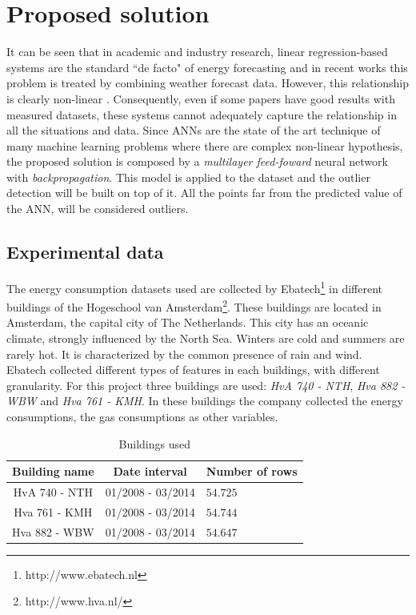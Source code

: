 \documentclass{sig-alternate-sigmod07}
\begin{document}
\section{Proposed solution}

It can be seen that in academic and industry research, linear regression-based systems are the standard ``de facto" of energy forecasting and in recent works this problem is treated by combining weather forecast data. However, this relationship is clearly non-linear \cite{hippert2001neural}. Consequently, even if some papers have good results with measured datasets, these systems cannot adequately capture the relationship in all the situations and data. Since ANNs are the state of the art technique of many machine learning problems where there are complex non-linear hypothesis, the proposed solution is composed by a \textit{multilayer feed-foward} neural network with \textit{backpropagation}. This model is applied to the dataset and the outlier detection will be built on top of it. All the points far from the predicted value of the ANN, will be considered outliers.

\subsection{Experimental data}
The energy consumption datasets used are collected by Ebatech\footnote{http://www.ebatech.nl} in different buildings of the Hogeschool van Amsterdam\footnote{http://www.hva.nl/}. These buildings are located in Amsterdam, the capital city of The Netherlands. This city has an oceanic climate, strongly influenced by the North Sea. Winters are cold and summers are rarely hot. It is characterized by the common presence of rain and wind.\\
Ebatech collected different types of features in each buildings, with different granularity. For this project three buildings are used: \textit{HvA 740 - NTH}, \textit{Hva 882 - WBW} and \textit{Hva 761 - KMH}. In these buildings the company collected the energy consumptions, the gas consumptions as other variables.

\begin{table}
\centering
\caption{Buildings used}
\label{tab:dataset}
\begin{tabular}{|c|c|l|} \hline
Building name&Date interval&Number of rows\\ \hline\hline
HvA 740 - NTH & 01/2008 - 03/2014 & $54.725$\\ \hline
Hva 761 - KMH & 01/2008 - 03/2014 & $54.744$\\ \hline
Hva 882 - WBW& 01/2008 - 03/2014 & $54.647$\\ \hline
\end{tabular}
\end{table}
\end{document}

